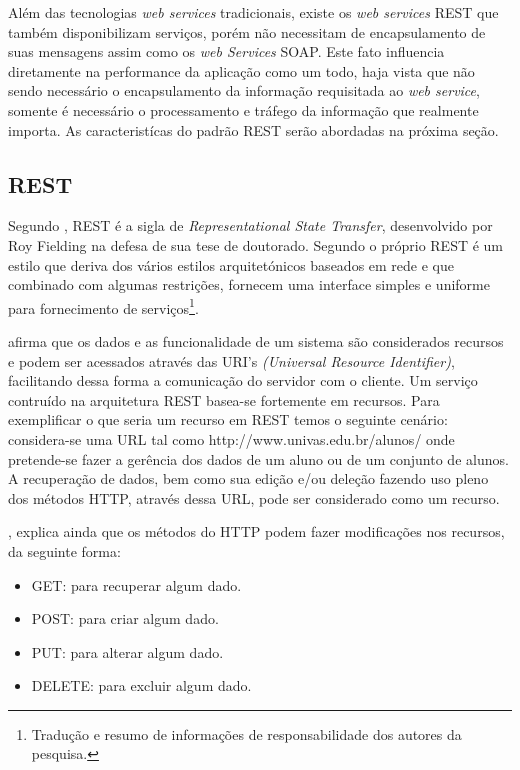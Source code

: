 	\par Além das tecnologias \textit{web services} tradicionais, existe os
\textit{web services} REST que também disponibilizam serviços, porém não
necessitam de encapsulamento de suas mensagens assim como os \textit{web
Services} SOAP. Este fato influencia diretamente na performance da aplicação
como um todo, haja vista que não sendo necessário o encapsulamento da informação
requisitada ao \textit{web service}, somente é necessário o processamento e
tráfego da informação que realmente importa. As caracteristícas do padrão REST
serão abordadas na próxima seção.

	\subsection{REST}
	
			\par Segundo , REST é a sigla de
		\textit{Representational State Transfer}, desenvolvido por Roy Fielding na
		defesa de sua tese de doutorado. Segundo o próprio 
		REST é um estilo que deriva dos vários estilos arquitetónicos baseados em rede
		e  que combinado com algumas restrições, fornecem uma interface simples e
		uniforme para fornecimento de serviços\footnote{Tradução e resumo de
		informações de responsabilidade dos autores da pesquisa.}.
			
			\par {} afirma que os dados e as funcionalidade de um
			sistema são considerados recursos e podem ser acessados através das URI's
		\textit{(Universal Resource Identifier)}, facilitando dessa forma a comunicação
		do servidor com o cliente. Um serviço contruído na arquitetura REST
		basea-se fortemente em recursos. Para exemplificar o que seria um recurso em
		REST temos o seguinte cenário: considera-se uma URL tal como 
		http://www.univas.edu.br/alunos/ onde pretende-se fazer a gerência dos dados
		de um aluno ou de um conjunto de alunos. A recuperação de dados, bem como sua
		edição e/ou deleção fazendo uso pleno dos métodos HTTP, através dessa URL,
		pode ser considerado como um recurso.
			\par {}, explica ainda que os métodos do HTTP podem fazer
		modificações nos recursos, da seguinte forma:
			
			 \begin{itemize}
			   \item GET: para recuperar algum dado. 
			   \item POST: para criar algum dado.
			   \item PUT: para alterar algum dado. 
			   \item DELETE: para excluir algum dado. 
			 \end{itemize}
			 	
